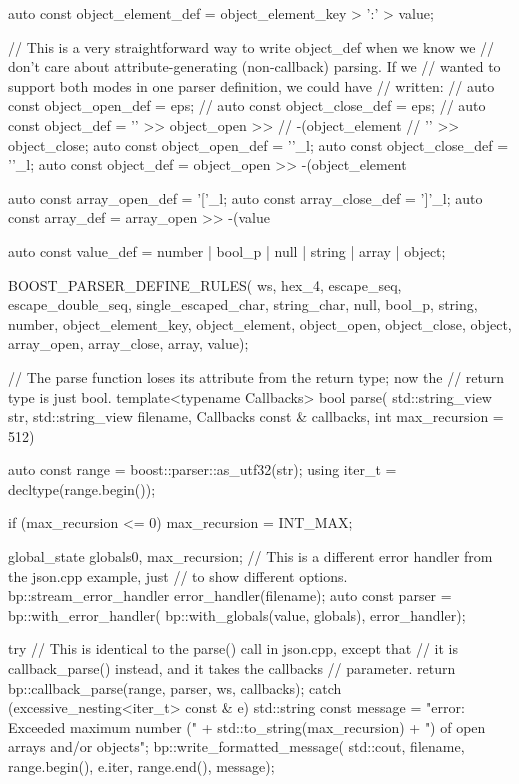 \begin{code}
{    auto const object_element_def = object_element_key > ':' > value;

    // This is a very straightforward way to write object_def when we know we
    // don't care about attribute-generating (non-callback) parsing.  If we
    // wanted to support both modes in one parser definition, we could have
    // written:
    //    auto const object_open_def = eps;
    //    auto const object_close_def = eps;
    //    auto const object_def = '{' >> object_open >>
    //                             -(object_element %
    //                            '}' >> object_close;
    auto const object_open_def = '{'_l;
    auto const object_close_def = '}'_l;
    auto const object_def = object_open >>
                            -(object_element %

    auto const array_open_def = '['_l;
    auto const array_close_def = ']'_l;
    auto const array_def = array_open >> -(value %

    auto const value_def = number | bool_p | null | string | array | object;

    BOOST_PARSER_DEFINE_RULES(
        ws,
        hex_4,
        escape_seq,
        escape_double_seq,
        single_escaped_char,
        string_char,
        null,
        bool_p,
        string,
        number,
        object_element_key,
        object_element,
        object_open,
        object_close,
        object,
        array_open,
        array_close,
        array,
        value);

    // The parse function loses its attribute from the return type; now the
    // return type is just bool.
    template<typename Callbacks>
    bool parse(
        std::string_view str,
        std::string_view filename,
        Callbacks const & callbacks,
        int max_recursion = 512)
    {
        auto const range = boost::parser::as_utf32(str);
        using iter_t = decltype(range.begin());

        if (max_recursion <= 0)
            max_recursion = INT_MAX;

        global_state globals{0, max_recursion};
        // This is a different error handler from the json.cpp example, just
        // to show different options.
        bp::stream_error_handler error_handler(filename);
        auto const parser = bp::with_error_handler(
            bp::with_globals(value, globals), error_handler);

        try {
            // This is identical to the parse() call in json.cpp, except that
            // it is callback_parse() instead, and it takes the callbacks
            // parameter.
            return bp::callback_parse(range, parser, ws, callbacks);
        } catch (excessive_nesting<iter_t> const & e) {
            std::string const message = "error: Exceeded maximum number (" +
                                        std::to_string(max_recursion) +
                                        ") of open arrays and/or objects";
            bp::write_formatted_message(
                std::cout,
                filename,
                range.begin(),
                e.iter,
                range.end(),
                message);
        }

}}
\end{code}

